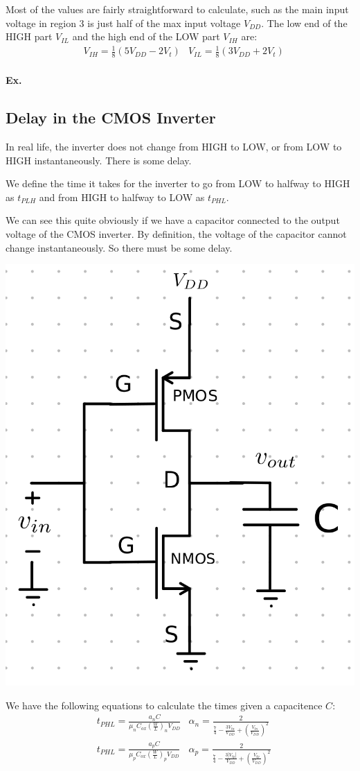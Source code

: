 \documentclass[12pt,letterpaper]{article} \usepackage{amsmath} \usepackage{graphicx} \usepackage[margin=1in]{geometry} \usepackage{longtable}  \usepackage{amssymb}
\begin{document}
	Most of the values are fairly straightforward to calculate, such as the main input voltage in region 3 is just half of the max input voltage $V_{DD}$. The low end of the HIGH part $V_{IL}$ and the high end of the LOW part $V_{IH}$ are:
	\begin{align*}
		&V_{IH} = \frac{1}{8} (5V_{DD} - 2V_t)  &V_{IL} = \frac{1}{8} (3V_{DD} + 2V_t)		\\
	\end{align*}

	\begin{mdframed}
		\textbf{Ex.}
	\end{mdframed}
	
	\subsection{Delay in the CMOS Inverter}
	In real life, the inverter does not change from HIGH to LOW, or from LOW to HIGH instantaneously. There is some delay.
	
	We define the time it takes for the inverter to go from LOW to halfway to HIGH as $t_{PLH}$ and from HIGH to halfway to LOW as $t_{PHL}$.
	
	We can see this quite obviously if we have a capacitor connected to the output voltage of the CMOS inverter. By definition, the voltage of the capacitor cannot change instantaneously. So there must be some delay. 
	\begin{center}
		\includegraphics[width=0.4\linewidth]{not-with-cap}
	\end{center}
	We have the following equations to calculate the times given a capacitence $C$:
	\begin{align*}
		&t_{PHL} = \frac{a_n C}{\mu_n C_{ox}\left(\frac{W}{L}\right)_n V_{DD}}& \alpha_n = \frac{2}{\frac{7}{4}-\frac{3V_{tn}}{V_{DD}}+\left(\frac{V_{tn}}{V_{DD}}\right)^2}\\
		&t_{PHL} = \frac{a_p C}{\mu_p C_{ox}\left(\frac{W}{L}\right)_p V_{DD}}& \alpha_p = \frac{2}{\frac{7}{4}-\frac{3|V_{tp}|}{V_{DD}}+\left(\frac{V_{tp}}{V_{DD}}\right)^2}
	\end{align*}
	
\end{document}
